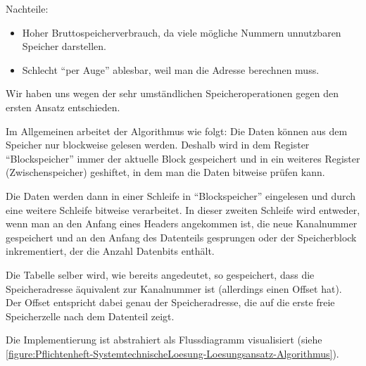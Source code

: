 Nachteile:
\begin{itemize}
    \item Hoher Bruttospeicherverbrauch, da viele mögliche Nummern unnutzbaren Speicher darstellen.
    \item Schlecht "`per Auge"' ablesbar, weil man die Adresse berechnen muss.
\end{itemize}

Wir haben uns wegen der sehr umständlichen Speicheroperationen gegen den ersten Ansatz entschieden.

Im Allgemeinen arbeitet der Algorithmus wie folgt: Die Daten können aus dem Speicher nur blockweise gelesen werden. Deshalb wird in dem Register "`Blockspeicher"' immer der aktuelle Block gespeichert und in ein weiteres Register (Zwischenspeicher) geshiftet, in dem man die Daten bitweise prüfen kann.

Die Daten werden dann in einer Schleife in "`Blockspeicher"' eingelesen und durch eine weitere Schleife bitweise verarbeitet. In dieser zweiten Schleife wird entweder, wenn man an den Anfang eines Headers angekommen ist, die neue Kanalnummer gespeichert und an den Anfang des Datenteils gesprungen oder der Speicherblock inkrementiert, der die Anzahl Datenbits enthält.

Die Tabelle selber wird, wie bereits angedeutet, so gespeichert, dass die Speicheradresse äquivalent zur Kanalnummer ist (allerdings einen Offset hat). Der Offset entspricht dabei genau der Speicheradresse, die auf die erste freie Speicherzelle nach dem Datenteil zeigt.

Die Implementierung ist abstrahiert als Flussdiagramm visualisiert (siehe \autoref{figure:Pflichtenheft-SystemtechnischeLoesung-Loesungsansatz-Algorithmus}).

